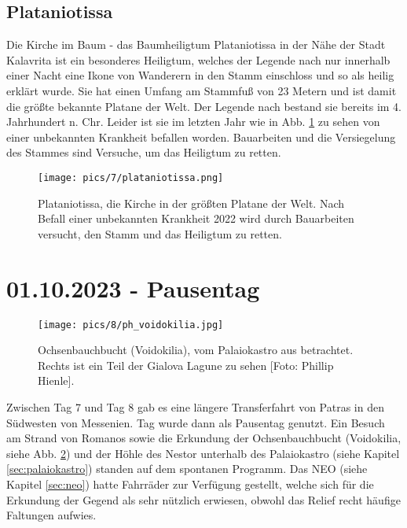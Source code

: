 \documentclass[preprint]{geomorphica} %
\begin{document}
\subsection{Plataniotissa}

Die Kirche im Baum - das Baumheiligtum Plataniotissa in der Nähe der Stadt Kalavrita ist ein besonderes Heiligtum, welches der Legende nach nur innerhalb einer Nacht eine Ikone von Wanderern in den Stamm einschloss und so als heilig erklärt wurde. Sie hat einen Umfang am Stammfuß von 23 Metern und ist damit die größte bekannte Platane der Welt. Der Legende nach bestand sie bereits im 4. Jahrhundert n. Chr. Leider ist sie im letzten Jahr wie in Abb. \ref{pic:plataniotissa} zu sehen von einer unbekannten Krankheit befallen worden. Bauarbeiten und die Versiegelung des Stammes sind Versuche, um das Heiligtum zu retten.

\vspace*{\fill}
\begin{figure}[h]
    \centering
    \texttt{[image: pics/7/plataniotissa.png]}
    \caption{Plataniotissa, die Kirche in der größten Platane der Welt. Nach Befall einer unbekannten Krankheit 2022 wird durch Bauarbeiten versucht, den Stamm und das Heiligtum zu retten.}
    \label{pic:plataniotissa}
\end{figure}


\newpage

\section{01.10.2023 - Pausentag}

\begin{figure}[!h]
    \centering
    \texttt{[image: pics/8/ph\_voidokilia.jpg]}
    \caption{Ochsenbauchbucht (Voidokilia), vom Palaiokastro aus betrachtet. Rechts ist ein Teil der Gialova Lagune zu sehen [Foto: Phillip Hienle].}
    \label{pic:voidokilia}
\end{figure}

Zwischen Tag 7 und Tag 8 gab es eine längere Transferfahrt von Patras in den Südwesten von Messenien. Tag \theday wurde dann als Pausentag genutzt. Ein Besuch am Strand von Romanos sowie die Erkundung der Ochsenbauchbucht (Voidokilia, siehe Abb. \ref{pic:voidokilia}) und der Höhle des Nestor unterhalb des Palaiokastro (siehe Kapitel \ref{sec:palaiokastro}) standen auf dem spontanen Programm. Das NEO (siehe Kapitel \ref{sec:neo}) hatte Fahrräder zur Verfügung gestellt, welche sich für die Erkundung der Gegend als sehr nützlich erwiesen, obwohl das Relief recht häufige Faltungen aufwies.
\end{document}

